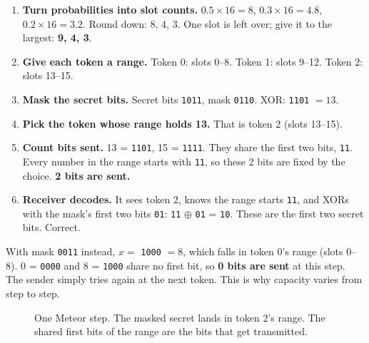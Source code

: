 \documentclass[11pt,a4paper]{article}
\begin{document}
\begin{enumerate}
  \item \textbf{Turn probabilities into slot counts.} $0.5{\times}16=8$, $0.3{\times}16=4.8$, $0.2{\times}16=3.2$. Round down: 8, 4, 3. One slot is left over; give it to the largest: \textbf{9, 4, 3}.
  \item \textbf{Give each token a range.} Token 0: slots 0--8. Token 1: slots 9--12. Token 2: slots 13--15.
  \item \textbf{Mask the secret bits.} Secret bits \texttt{1011}, mask \texttt{0110}. XOR: \texttt{1101} $= 13$.
  \item \textbf{Pick the token whose range holds 13.} That is token 2 (slots 13--15).
  \item \textbf{Count bits sent.} 13 = \texttt{1101}, 15 = \texttt{1111}. They share the first two bits, \texttt{11}. Every number in the range starts with \texttt{11}, so these 2 bits are fixed by the choice. \textbf{2 bits are sent.}
  \item \textbf{Receiver decodes.} It sees token 2, knows the range starts \texttt{11}, and XORs with the mask's first two bits \texttt{01}: \texttt{11} $\oplus$ \texttt{01} = \texttt{10}. These are the first two secret bits. Correct.
\end{enumerate}

With mask \texttt{0011} instead, $x=$ \texttt{1000} $=8$, which falls in token 0's range (slots 0--8).
0 = \texttt{0000} and 8 = \texttt{1000} share no first bit, so \textbf{0 bits are sent} at this step.
The sender simply tries again at the next token. This is why capacity varies from step to step.

\begin{figure}[H]\centering
{}
\caption{One Meteor step. The masked secret lands in token 2's range. The shared first bits of the range are the bits that get transmitted.}
\end{figure}
\end{document}
